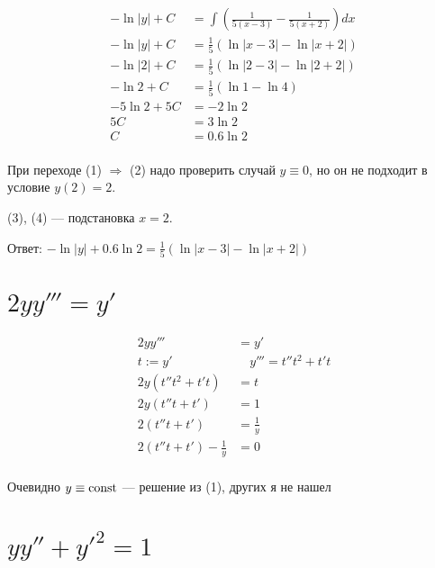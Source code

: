 \begin{align*}
    -\ln|y| + C & = \int \left(\frac{1}{5(x-3)} - \frac{1}{5(x+2)}\right)dx \\
    -\ln|y| + C & = \frac{1}{5}\left(\ln|x-3| - \ln|x+2|\right)             \\
    -\ln|2| + C & = \frac{1}{5}\left(\ln|2-3| - \ln|2+2|\right)  \tag{4}    \\
    -\ln2 + C   & = \frac{1}{5}\left(\ln1 - \ln4\right)                     \\
    -5\ln2 + 5C & = - 2\ln2                                                 \\
    5C          & = 3\ln2                                                   \\
    C           & = 0.6\ln2                                                 \\
\end{align*}

При переходе (1) $\Rightarrow$ (2) надо проверить случай $y\equiv0$, но он не подходит в условие $y(2)=2$.

(3), (4) --- подстановка $x=2$.

Ответ: $-\ln|y| + 0.6\ln2 = \frac{1}{5}\left(\ln|x-3| - \ln|x+2|\right)$

\section{$2yy'''=y'$}

\begin{align*}
    2yy'''                   & = y'                    \\
    t := y'                  & \quad y''' = t''t^2+t't \\
    2y(t''t^2+t't)           & = t             \tag{1} \\
    2y(t''t+t')              & = 1                     \\
    2(t''t+t')               & = \frac{1}{y}           \\
    2(t''t+t') - \frac{1}{y} & = 0                     \\
\end{align*}

Очевидно $y\equiv\text{const}$ --- решение из (1), других я не нашел

\section{$yy''+y'^2=1$}

